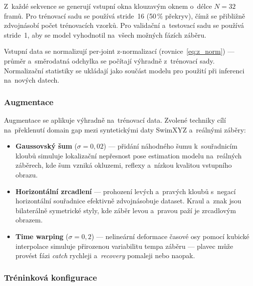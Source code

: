 Z~každé sekvence se generují vstupní okna klouzavým oknem o~délce $N = 32$ framů. Pro trénovací sadu se používá stride~16 (50\,\% překryv), čímž se přibližně zdvojnásobí počet trénovacích vzorků. Pro validační a~testovací sadu se používá stride~1, aby se model vyhodnotil na~všech možných fázích záběru.

Vstupní data se normalizují per-joint z-normalizací (rovnice~\ref{eq:z_norm}) --- průměr a~směrodatná odchylka se počítají výhradně z~trénovací sady. Normalizační statistiky se ukládají jako součást modelu pro použití při inferenci na~nových datech.

\subsubsection{Augmentace}

Augmentace se aplikuje výhradně na~trénovací data. Zvolené techniky cílí na~překlenutí domain gap mezi syntetickými daty SwimXYZ a~reálnými záběry:
\begin{itemize}
    \item \textbf{Gaussovský šum} ($\sigma = 0{,}02$) --- přidání náhodného šumu k~souřadnicím kloubů simuluje lokalizační nepřesnost pose estimation modelu na~reálných záběrech, kde šum vzniká okluzemi, reflexy a~nízkou kvalitou vstupního obrazu.
    \item \textbf{Horizontální zrcadlení} --- prohození levých a~pravých kloubů s~negací horizontální souřadnice efektivně zdvojnásobuje dataset. Kraul a~znak jsou bilaterálně symetrické styly, kde záběr levou a~pravou paží je zrcadlovým obrazem.
    \item \textbf{Time warping} ($\sigma = 0{,}2$) --- nelineární deformace časové osy pomocí kubické interpolace simuluje přirozenou variabilitu tempa záběru --- plavec může provést fázi \textit{catch} rychleji a~\textit{recovery} pomaleji nebo naopak.
\end{itemize}

\subsubsection{Tréninková konfigurace}

